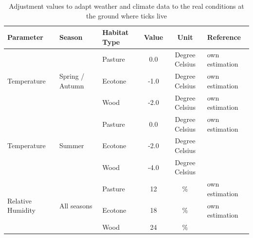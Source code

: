 \documentclass[a4paper, 11pt]{scrartcl}
\begin{document}
\begin{table}[h!]
\caption{Adjustment values to adapt weather and climate data to the real conditions at the ground where ticks live}
\label{tab:micro_climate_adjustments}
\begin{tabular}{@{}lllccl@{}}
\toprule
\textbf{Parameter}					& \textbf{Season} 					& \textbf{Habitat Type}  & \textbf{Value}  	& \textbf{Unit} & \textbf{Reference} \\
\midrule
\multirow{3}{*}{Temperature} 		& \multirow{3}{*}{Spring / Autumn}  & Pasture 				 &   0.0   			& Degree Celsius & own estimation \\
									&									& Ecotone 				 &   -1.0 	  		& Degree Celsius & own estimation	\\
									&					 				& Wood    				 &   -2.0   		& Degree Celsius & own estimation	\\
\midrule
\multirow{3}{*}{Temperature} 		& \multirow{3}{*}{Summer}        	& Pasture 				 &   0.0    		& Degree Celsius & own estimation \\
									&				 	 				& Ecotone 				 &  -2.0    		& Degree Celsius & ~\cite{Geiger.1995} \\
									&				 	 				& Wood	   				 &  -4.0    		& Degree Celsius & ~\cite{Bonan.2016} \\
\midrule
\multirow{3}{*}{Relative Humidity}  & \multirow{3}{*}{All seasons}      & Pasture 				 &   12   			& \%			& own estimation \\
									&				 					& Ecotone 				 &   18    			& \%    		& own estimation \\
									&				 					& Wood    				 &   24    			& \%			& ~\cite{Boehnke.2017} 	\\
\bottomrule
\end{tabular}
\end{table}



\newpage
\printbibliography[heading = bibintoc, title = {Bibliography}]
\end{document}
